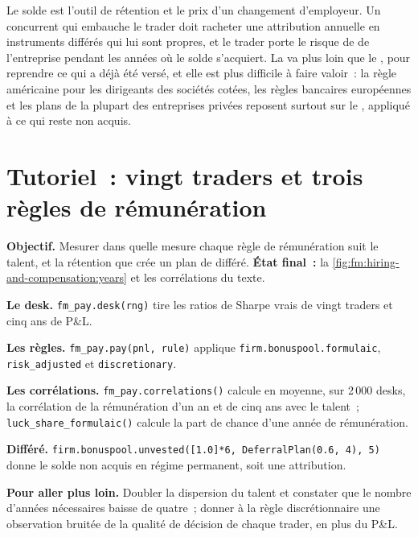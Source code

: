 Le solde est l'outil de rétention et le prix d'un changement d'employeur. Un concurrent qui embauche le trader doit racheter une attribution annuelle en
instruments différés qui lui sont propres, et le trader porte le risque de  de l'entreprise pendant les années où le solde s'acquiert. La  va plus loin que le , pour
reprendre ce qui a déjà été versé, et elle est plus difficile à faire valoir~: la règle américaine pour les dirigeants des sociétés cotées, les règles bancaires européennes et les plans de la plupart des entreprises privées
reposent surtout sur le , appliqué à ce qui reste non acquis.

\section{Tutoriel~: vingt traders et trois règles de rémunération}\label{tut:fm:hiring-and-compensation:tut}

\begin{tutorial}
\textbf{Objectif.} Mesurer dans quelle mesure chaque règle de rémunération suit le talent, et la rétention que crée un plan de différé. \textbf{État final~:}
la \cref{fig:fm:hiring-and-compensation:years} et les corrélations du texte.
\begin{tutsteps}
\item \textbf{Le desk.} \texttt{fm\_pay.desk(rng)} tire les ratios de Sharpe vrais de vingt traders et cinq ans de P\&L.
\item \textbf{Les règles.} \texttt{fm\_pay.pay(pnl, rule)} applique \texttt{firm.bonuspool.formulaic}, \texttt{risk\_adjusted} et
\texttt{discretionary}.
\item \textbf{Les corrélations.} \texttt{fm\_pay.correlations()} calcule en moyenne, sur 2\,000 desks, la corrélation de la rémunération d'un an et de cinq ans avec le talent~;
\texttt{luck\_share\_formulaic()} calcule la part de chance d'une année de rémunération.
\item \textbf{Différé.} \texttt{firm.bonuspool.unvested([1.0]*6, DeferralPlan(0.6, 4), 5)} donne le solde non acquis en régime permanent, soit une attribution.
\end{tutsteps}
\end{tutorial}

\textbf{Pour aller plus loin.} Doubler la dispersion du talent et constater que le nombre d'années nécessaires baisse de quatre~; donner à la règle discrétionnaire une observation bruitée de
la qualité de décision de chaque trader, en plus du P\&L.

